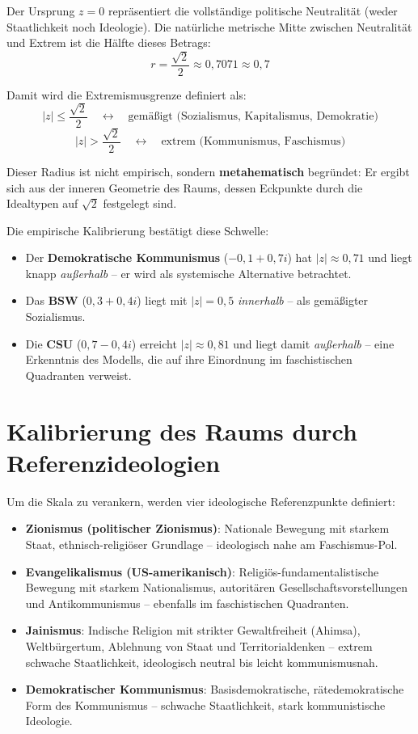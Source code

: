 \documentclass[12pt, a4paper]{article}
\begin{document}
Der Ursprung \(z = 0\) repräsentiert die vollständige politische Neutralität (weder Staatlichkeit noch Ideologie). Die natürliche metrische Mitte zwischen Neutralität und Extrem ist die Hälfte dieses Betrags:
\[
r = \frac{\sqrt{2}}{2} \approx 0{,}7071 \approx 0{,}7
\]

Damit wird die Extremismusgrenze definiert als:
\[
|z| \le \frac{\sqrt{2}}{2} \quad \longleftrightarrow \quad \text{gemäßigt (Sozialismus, Kapitalismus, Demokratie)}
\]
\[
|z| > \frac{\sqrt{2}}{2} \quad \longleftrightarrow \quad \text{extrem (Kommunismus, Faschismus)}
\]

Dieser Radius ist nicht empirisch, sondern \textbf{metahematisch} begründet: Er ergibt sich aus der inneren Geometrie des Raums, dessen Eckpunkte durch die Idealtypen auf \(\sqrt{2}\) festgelegt sind.

Die empirische Kalibrierung bestätigt diese Schwelle:
\begin{itemize}
    \item Der \textbf{Demokratische Kommunismus} (\(-0{,}1 + 0{,}7i\)) hat \(|z| \approx 0{,}71\) und liegt knapp \emph{außerhalb} – er wird als systemische Alternative betrachtet.
    \item Das \textbf{BSW} (\(0{,}3 + 0{,}4i\)) liegt mit \(|z| = 0{,}5\) \emph{innerhalb} – als gemäßigter Sozialismus.
    \item Die \textbf{CSU} (\(0{,}7 - 0{,}4i\)) erreicht \(|z| \approx 0{,}81\) und liegt damit \emph{außerhalb} – eine Erkenntnis des Modells, die auf ihre Einordnung im faschistischen Quadranten verweist.
\end{itemize}

\section*{Kalibrierung des Raums durch Referenzideologien}

Um die Skala zu verankern, werden vier ideologische Referenzpunkte definiert:

\begin{itemize}
    \item \textbf{Zionismus (politischer Zionismus)}: Nationale Bewegung mit starkem Staat, ethnisch-religiöser Grundlage – ideologisch nahe am Faschismus-Pol.
    \item \textbf{Evangelikalismus (US-amerikanisch)}: Religiös-fundamentalistische Bewegung mit starkem Nationalismus, autoritären Gesellschaftsvorstellungen und Antikommunismus – ebenfalls im faschistischen Quadranten.
    \item \textbf{Jainismus}: Indische Religion mit strikter Gewaltfreiheit (Ahimsa), Weltbürgertum, Ablehnung von Staat und Territorialdenken – extrem schwache Staatlichkeit, ideologisch neutral bis leicht kommunismusnah.
    \item \textbf{Demokratischer Kommunismus}: Basisdemokratische, rätedemokratische Form des Kommunismus – schwache Staatlichkeit, stark kommunistische Ideologie.
\end{itemize}
\end{document}
